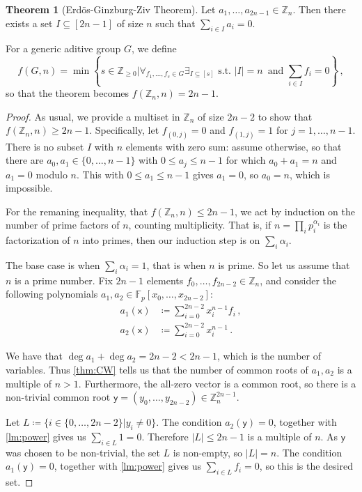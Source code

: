 \documentclass[12pt]{amsart}
\theoremstyle{definition}
\newtheorem{thm}{Theorem}[section]
\newcommand{\Z}{\mathbb{Z}}
\newcommand{\F}{\mathbb{F}}
\newcommand{\vx}{\mathsf{x}}
\newcommand{\vy}{\mathsf{y}}
\begin{document}
\begin{thm}[Erd\"os-Ginzburg-Ziv Theorem]
Let $a_1, \ldots, a_{2n-1} \in \Z_n $.
Then there exists a set $I\subseteq [2n-1] $ of size $n$ such that $\sum_{i\in I} a_i = 0$.
\end{thm}

For a generic aditive group $G$, we define
$$ f(G, n) = \min \left\{ s \in \Z_{\geq 0} \Big| \forall_{f_1, \ldots, f_s \in G} \exists_{I \subseteq [s]} \text{ s.t. } |I| = n \, \text{ and } \sum_{i \in I} f_i = 0 \right\} \, ,$$
so that the theorem becomes $ f(\Z_n, n) = 2n - 1$.

\begin{proof}
As usual, we provide a multiset in $\Z_n$ of size $2n-2$ to show that $f(\Z_n, n) \geq 2n-1$.
Specifically, let $f_{(0, j)} = 0$ and $f_{(1, j)} = 1$ for $j=1, \ldots, n-1$.
There is no subset $I$ with $n$ elements with zero sum:
assume otherwise, so that there are $a_0, a_1 \in \{0, \ldots, n-1\}$ with $0 \leq a_j \leq n-1$ for which $a_0 + a_1 = n$ and $ a_1 = 0$ modulo $n$.
This with $0 \leq a_1 \leq n-1$ gives $a_1 = 0$, so $a_0 = n$, which is impossible.


For the remaning inequality, that $f(\Z_n, n) \leq 2n - 1$, we act by induction on the number of prime factors of $n$, counting multiplicity.
That is, if $n = \prod_i p_i^{\alpha_i}$ is the factorization of $n$ into primes, then our induction step is on $\sum_i \alpha_i$.

The base case is when $\sum_i \alpha_i = 1$, that is when $n$ is prime.
So let us assume that $n$ is a prime number.
Fix $2n - 1$ elements $f_{0}, \ldots, f_{2n  - 2} \in \Z_n$, and consider the following polynomials $a_1, a_2 \in \F_p[x_0, \ldots, x_{2n  - 2 }]$:
\begin{align*}
a_1(\vx ) &\coloneqq \sum_{i=0}^{2n-2} x_i^{n-1}f_i \, , \\
a_2(\vx ) &\coloneqq \sum_{i=0}^{2n-2} x_i^{n-1} \, .
\end{align*}

We have that $\deg a_1 + \deg a_2 = 2n-2 < 2n-1$, which is the number of variables.
Thus \cref{thm:CW} tells us that the number of common roots of $a_1, a_2$ is a multiple of $n > 1$.
Furthermore, the all-zero vector is a common root, so there is a non-trivial common root $\vy = (y_0 , \ldots, y_{2n-2}) \in \Z_n^{2n-1}$.


Let $L \coloneqq \{ i\in\{0, \ldots, 2n - 2\} | y_i \neq 0 \}$.
The condition $a_2(\vy) = 0$, together with \cref{lm:power} gives us $\sum_{i\in L} 1 = 0$.
Therefore $|L|\leq 2n-1$ is a multiple of $n$.
As $\vy $ was chosen to be non-trivial, the set $L$ is non-empty, so $|L| = n$.
The condition $a_1(\vy) = 0$, together with \cref{lm:power} gives us $\sum_{i\in L} f_i = 0$, so this is the desired set.


\end{proof}
\end{document}

